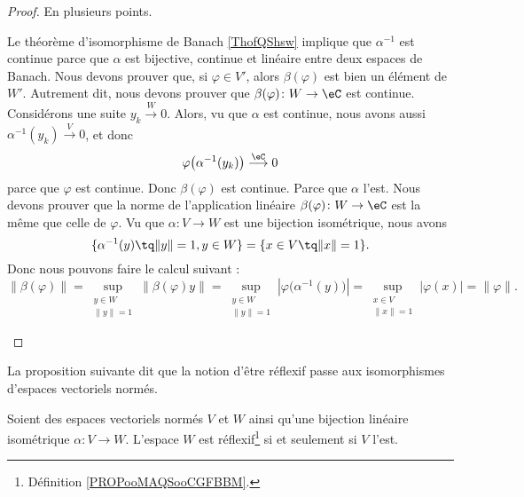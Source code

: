 \begin{proof}
	En plusieurs points.
	\begin{subproof}
		Le théorème d'isomorphisme de Banach \ref{ThofQShsw} implique que \( \alpha^{-1}\) est continue parce que \( \alpha\) est bijective, continue et linéaire entre deux espaces de Banach.
		Nous devons prouver que, si \( \varphi\in V'\), alors \( \beta(\varphi)\) est bien un élément de \( W'\). Autrement dit, nous devons prouver que \(  \beta(\varphi)\colon W\to \eC   \) est continue. Considérons une suite \( y_k\stackrel{W}{\longrightarrow}0\). Alors, vu que \( \alpha\) est continue, nous avons aussi \( \alpha^{-1}(y_k)\stackrel{V}{\longrightarrow}0\), et donc
		\begin{equation}
			\varphi\big( \alpha^{-1}(y_k) \big)\stackrel{\eC}{\longrightarrow}0
		\end{equation}
		parce que \( \varphi\) est continue. Donc \( \beta(\varphi)\) est continue.
		Parce que \( \alpha\) l'est.
		Nous devons prouver que la norme de l'application linéaire \( \beta(\varphi)\colon W\to \eC\) est la même que celle de \( \varphi\). Vu que \( \alpha\colon V\to W\) est une bijection isométrique, nous avons
		\begin{equation}
			\{ \alpha^{-1}(y)\tq \| y \|=1,y\in W \}=\{ x\in V\tq \|x  \|=1 \}.
		\end{equation}
		Donc nous pouvons faire le calcul suivant :
		\begin{equation}
			\| \beta(\varphi) \|=\sup_{\substack{y\in W\\\| y \|=1}}\| \beta(\varphi)y \|
			=\sup_{\substack{y\in W\\\| y \|=1}}| \varphi\big( \alpha^{-1}(y) \big) |
			=\sup_{\substack{x\in V\\\| x \|=1}}| \varphi(x) |
			=\| \varphi \|.
		\end{equation}
	\end{subproof}
\end{proof}

La proposition suivante dit que la notion d'être réflexif passe aux isomorphismes d'espaces vectoriels normés.
\begin{proposition}      \label{PROPooVRQKooLdmajh}
	Soient des espaces vectoriels normés \( V\) et \( W\) ainsi qu'une bijection linéaire isométrique \( \alpha\colon V\to W\). L'espace \( W\) est réflexif\footnote{Définition \ref{PROPooMAQSooCGFBBM}.} si et seulement si \( V\) l'est.
\end{proposition}

